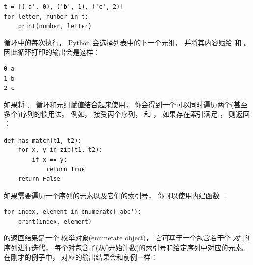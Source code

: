 {\begin{lstlisting}
t = [('a', 0), ('b', 1), ('c', 2)]
for letter, number in t:
    print(number, letter)
\end{lstlisting}

%

循环中的每次执行， Python 会选择列表中的下一个元组，
并将其内容赋给   和  。
因此循环打印的输出会是这样：

\begin{lstlisting}
0 a
1 b
2 c
\end{lstlisting}

%

如果将 、 循环和元组赋值结合起来使用，
你会得到一个可以同时遍历两个(甚至多个)序列的惯用法。
例如，  接受两个序列，  和 ，
如果存在索引满足  ， 则返回 ：

\begin{lstlisting}
def has_match(t1, t2):
    for x, y in zip(t1, t2):
        if x == y:
            return True
    return False
\end{lstlisting}

%

如果需要遍历一个序列的元素以及它们的索引号， 你可以使用内建函数 ：
  

\begin{lstlisting}
for index, element in enumerate('abc'):
    print(index, element)
\end{lstlisting}

%

 的返回结果是一个 枚举对象(enumerate object)，
它可基于一个包含若干个 \emph{对} 的序列进行迭代，
每个对包含了(从0开始计数)的索引号和给定序列中对应的元素。
在刚才的例子中， 对应的输出结果会和前例一样：

}

